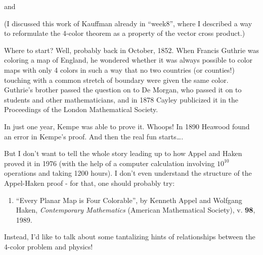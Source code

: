 \documentclass{article}
\def\tightlist{}
\renewcommand{\texttt}[1]{%
  \begingroup
  \ttfamily
  \begingroup\lccode`~=`/\lowercase{\endgroup\def~}{/\discretionary{}{}{}}%
  \begingroup\lccode`~=`[\lowercase{\endgroup\def~}{[\discretionary{}{}{}}%
  \begingroup\lccode`~=`.\lowercase{\endgroup\def~}{.\discretionary{}{}{}}%
  \catcode`/=\active\catcode`[=\active\catcode`.=\active
  \scantokens{#1\noexpand}%
  \endgroup
}
\begin{document}
and


(I discussed this work of Kauffman already in ``week8'', where I
described a way to reformulate the 4-color theorem as a property of the
vector cross product.)

Where to start? Well, probably back in October, 1852. When Francis
Guthrie was coloring a map of England, he wondered whether it was always
possible to color maps with only 4 colors in such a way that no two
countries (or counties!) touching with a common stretch of boundary were
given the same color. Guthrie's brother passed the question on to De
Morgan, who passed it on to students and other mathematicians, and in
1878 Cayley publicized it in the Proceedings of the London Mathematical
Society.

In just one year, Kempe was able to prove it. Whoops! In 1890 Heawood
found an error in Kempe's proof. And then the real fun starts\ldots.

But I don't want to tell the whole story leading up to how Appel and
Haken proved it in 1976 (with the help of a computer calculation
involving \(10^10\) operations and taking 1200 hours). I don't even
understand the structure of the Appel-Haken proof - for that, one should
probably try:

\begin{enumerate}
\def\labelenumi{\arabic{enumi})}
\setcounter{enumi}{2}
\tightlist
\item
  ``Every Planar Map is Four Colorable'', by Kenneth Appel and Wolfgang
  Haken, \emph{Contemporary Mathematics} (American Mathematical
  Society), v. \textbf{98}, 1989.
\end{enumerate}

Instead, I'd like to talk about some tantalizing hints of relationships
between the 4-color problem and physics!
\end{document}
